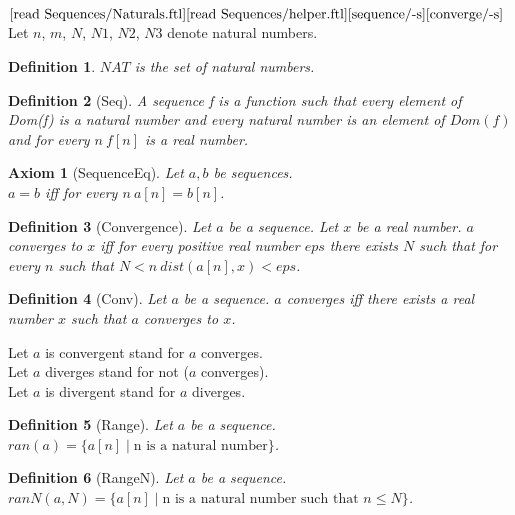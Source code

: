 \documentclass{article}
\newenvironment{forthel}{\begin{leftbar}}{\end{leftbar}}
\newtheorem{axiom}{Axiom}
\newtheorem{definition}{Definition}
\begin{document}
\begin{forthel}
	\noindent $\text{[read Sequences/Naturals.ftl]}\\
	\text{[read Sequences/helper.ftl]}\\
	\text{[sequence/-s]}\\
	\text{[converge/-s]}$\\
	Let $n$, $m$, $N$, $N1$, $N2$, $N3$ denote natural numbers.
	
	\begin{definition}
		$NAT$ is the set of natural numbers.
	\end{definition}
	
	\begin{definition}[Seq]	A sequence f is a function such that every element of Dom(f) is a natural number and every
	natural number is an element of $Dom(f)$ and for every $n \ f[n]$ is a real number.
	\end{definition}
	
	\begin{axiom} [SequenceEq] Let $a, b$ be sequences. \\ $a = b$ iff for every $n \ a[n] = b[n]$.
	\end{axiom}
	
	\begin{definition} [Convergence] Let $a$ be a sequence. Let $x$ be a real number. $a$ converges to $x$ iff for every positive real
	number $eps$ there exists $N$ such that for every $n$ such that $N < n \ dist(a[n],x) < eps$.
	\end{definition}
	
	\begin{definition} [Conv] Let $a$ be a sequence. $a$ converges iff there exists a real number $x$ such that $a$ converges to $x$.
	\end{definition}
	
	\noindent Let $a$ is convergent stand for $a$ converges.
	\\Let $a$ diverges stand for not ($a$ converges).
	\\Let $a$ is divergent stand for $a$ diverges.
	
	\begin{definition} [Range] Let $a$ be a sequence. $ran(a) = \{a[n] \mid \text{n is a natural number}\}$. 
	\end{definition}

	\begin{definition} [RangeN] Let $a$ be a sequence. $ranN(a,N) = \{a[n] \mid \text{n is a natural number such that } n \leq N\}$.
	\end{definition}
	

\end{forthel}
\end{document}
